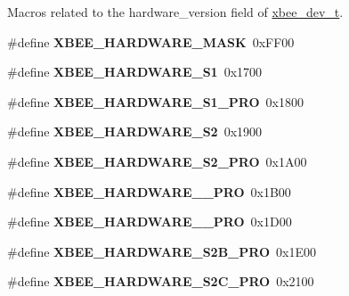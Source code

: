 Macros related to the {\ttfamily hardware\+\_\+version} field of \hyperlink{structxbee__dev__t}{xbee\+\_\+dev\+\_\+t}. \begin{DoxyCompactItemize}
\item 
\mbox{\label{group__xbee__device_ga30868ac420d74847abdb02bb3b53f0ca}} 
\#define {\bfseries X\+B\+E\+E\+\_\+\+H\+A\+R\+D\+W\+A\+R\+E\+\_\+\+M\+A\+SK}~0x\+F\+F00
\item 
\mbox{\label{group__xbee__device_ga619703ca20c7f3cafe06387c97960f97}} 
\#define {\bfseries X\+B\+E\+E\+\_\+\+H\+A\+R\+D\+W\+A\+R\+E\+\_\+\+S1}~0x1700
\item 
\mbox{\label{group__xbee__device_gaa71ee41dab497b298098f09c078389bf}} 
\#define {\bfseries X\+B\+E\+E\+\_\+\+H\+A\+R\+D\+W\+A\+R\+E\+\_\+\+S1\+\_\+\+P\+RO}~0x1800
\item 
\mbox{\label{group__xbee__device_ga77c2abc2a2b981882611bcd2304b04b9}} 
\#define {\bfseries X\+B\+E\+E\+\_\+\+H\+A\+R\+D\+W\+A\+R\+E\+\_\+\+S2}~0x1900
\item 
\mbox{\label{group__xbee__device_ga7ac5ee1f16299178b097d77f6090c426}} 
\#define {\bfseries X\+B\+E\+E\+\_\+\+H\+A\+R\+D\+W\+A\+R\+E\+\_\+\+S2\+\_\+\+P\+RO}~0x1\+A00
\item 
\mbox{\label{group__xbee__device_gad02abeef1b5630075c6f9b1f8d9ebe6e}} 
\#define {\bfseries X\+B\+E\+E\+\_\+\+H\+A\+R\+D\+W\+A\+R\+E\+\_\+\_\+\+P\+RO}~0x1\+B00
\item 
\mbox{\label{group__xbee__device_ga0bd900693a71cd8b6f9a26b730791712}} 
\#define {\bfseries X\+B\+E\+E\+\_\+\+H\+A\+R\+D\+W\+A\+R\+E\+\_\+\_\+\+P\+RO}~0x1\+D00
\item 
\mbox{\label{group__xbee__device_gabe497a567ff238bd15cfd0f1d8e87a80}} 
\#define {\bfseries X\+B\+E\+E\+\_\+\+H\+A\+R\+D\+W\+A\+R\+E\+\_\+\+S2\+B\+\_\+\+P\+RO}~0x1\+E00
\item 
\mbox{\label{group__xbee__device_ga5b54a06757ceed4579394de8b630864d}} 
\#define {\bfseries X\+B\+E\+E\+\_\+\+H\+A\+R\+D\+W\+A\+R\+E\+\_\+\+S2\+C\+\_\+\+P\+RO}~0x2100

\end{DoxyCompactItemize}
